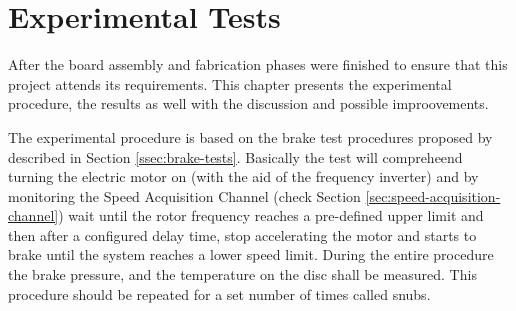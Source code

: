 \chapter{Experimental Tests}\label{ch:experimentalTests}
		After the board assembly and fabrication phases were finished to ensure that this project attends its requirements. This chapter presents the experimental procedure, the results as well with the discussion and possible improovements.
		\par
		The experimental procedure is based on the brake test procedures proposed by \cite{saej2522} described in Section \ref{ssec:brake-tests}. Basically the test will compreheend turning the electric motor on (with the aid of the frequency inverter) and by monitoring the Speed Acquisition Channel (check Section \ref{sec:speed-acquisition-channel}) wait until the rotor frequency reaches a pre-defined upper limit and then after a configured delay time, stop accelerating the motor and starts to brake until the system reaches a lower speed limit. During the entire procedure the brake pressure, and the temperature on the disc shall be measured. This procedure should be repeated for a set number of times called snubs. 

		
		
		